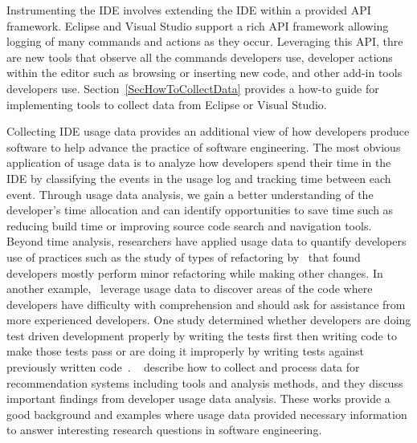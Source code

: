 \documentclass{book}
\begin{document}
Instrumenting the IDE involves extending the IDE within a provided API framework.  Eclipse and Visual Studio support a rich API framework allowing logging of many commands and actions as they occur.  Leveraging this API, thre are new tools that observe all the commands developers use, developer actions within the editor such as browsing or inserting new code, and other add-in tools developers use.  Section~\ref{SecHowToCollectData} provides a how-to guide for implementing tools to collect data from Eclipse or Visual Studio.  

Collecting IDE usage data provides an additional view of how developers produce software to help advance the practice of software engineering.  
The most obvious application of usage data is to analyze how developers spend their time in the IDE by classifying the events in the usage log and tracking time between each event.  Through usage data analysis, we gain a better understanding of the developer's time allocation and can identify opportunities to save time such as reducing build time or improving source code search and navigation tools.  Beyond time analysis, researchers have applied usage data to quantify developers use of practices such as the study of types of refactoring by~ that found developers mostly perform minor refactoring while making other changes.  In another example,~ leverage usage data to discover areas of the code where developers have difficulty with comprehension and should ask for assistance from more experienced developers.  One study determined whether developers are doing test driven development properly by writing the tests first then writing code to make those tests pass or are doing it improperly by writing tests against previously written code~\cite{Kou2010Operational}.  ~ describe how to collect and process data for recommendation systems including tools and analysis methods, and they discuss important findings from developer usage data analysis.    These works provide a good background and examples where usage data provided necessary information to answer interesting research questions in software engineering.

\end{document}
